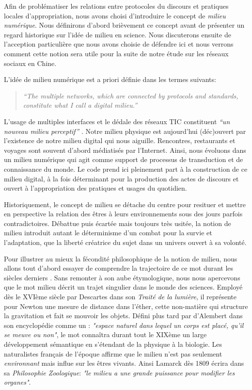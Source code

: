 Afin de problématiser les relations entre protocoles du discours et pratiques locales d’appropriation, nous avons choisi d’introduire le concept de \textit{milieu numérique}. Nous définirons d’abord brièvement ce concept avant de présenter un regard historique sur l’idée de milieu en science. Nous discuterons ensuite de l’acception particulière que nous avons choisie de défendre ici et nous verrons comment cette notion sera utile pour la suite de notre étude sur les réseaux sociaux en Chine.

L’idée de milieu numérique est a priori définie dans les termes suivants:

\begin{quote}
    \textit{``The multiple networks, which are connected by protocols and standards, constitute what I call a digital milieu.''} \citep{Hui2012}
\end{quote}

L’usage de multiples interfaces et le dédale des réseaux TIC constituent \textit{``un nouveau milieu perceptif''} \citep{Barboza2006}. Notre milieu physique est aujourd’hui (déc)ouvert par l’existence de notre milieu digital qui nous aiguille. Rencontres, restaurants et voyages sont souvent d'abord médiatisés par l’Internet. Ainsi, nous évoluons dans un milieu numérique qui agit comme support de processus de transduction et de connaissance du monde. Le code prend ici pleinement part à la construction de ce milieu digital, à la fois déterminant pour la production des actes de discours et ouvert à l’appropriation des pratiques et usages du quotidien.

Historiquement, le concept de milieu se détache du centre pour resituer et mettre en perspective la relation des êtres à leurs environnements sous des jours parfois contradictoires. Débattue puis écartée mais toujours très usitée, la notion de milieu introduit autant le déterminisme d’un combat pour la survie et l’adaptation, que la liberté créatrice du sujet dans un univers ouvert à sa volonté. 

Pour illustrer au mieux la fécondité philosophique de la notion de milieu, nous allons tout d’abord essayer de comprendre la trajectoire de ce mot durant les siècles derniers \citep{Canguilhem1965}. Sans remonter à son aube étymologique, nous nous apercevons que le mot milieu décrit un trajet singulier dans le monde des sciences. Employé dès le XVIème siècle par Descartes dans son \textit{Traité de la lumière}, il représente pour Newton une mesure de distance dans l’éther, cette non-matière qui structure la gravitation et fait se mouvoir les objets. Défini plus tard par d'Alembert dans son encyclopédie comme un : \textit{"espace naturel dans lequel un corps est placé, qu'il se meuve ou non"}, le mot connaîtra durant tout le XIXème un large développement sémantique en s'étendant de la physique à la biologie. Les naturalistes français de l’époque affirme que le milieu n’est pas seulement \textit{environnant} mais influe sur les êtres vivants. Ainsi Lamarck dès 1809 écrira dans sa \textit{Philosophie Zoologique}: \textit{"le milieu a une grande puissance pour modifier les organes"}. 

